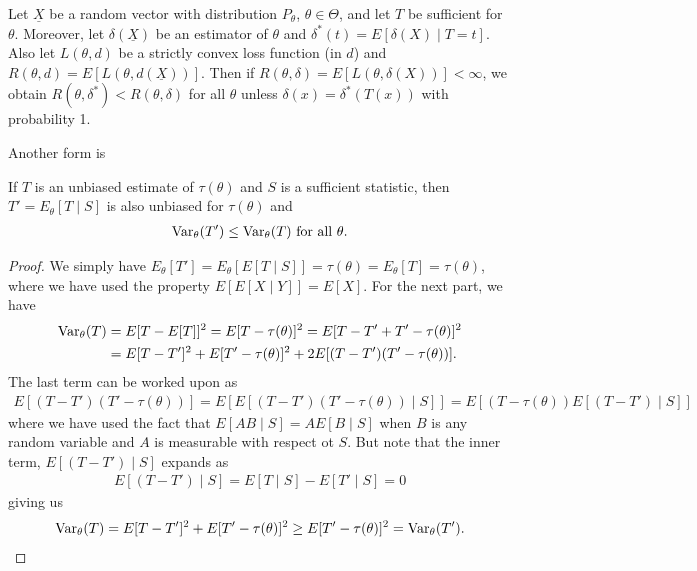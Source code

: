 \begin{theorem}
    Let $\underline{X}$ be a random vector with distribution $P_{\theta}$, $\theta \in \Theta$, and let $T$ be sufficient for $\theta$. Moreover, let $\delta(\underline{X})$ be an estimator of $\theta$ and $\delta^{\ast}(t) = E[\delta(X) \mid T = t]$. Also let $L(\theta,d)$ be a strictly convex loss function (in $d$) and $R(\theta,d) = E[L(\theta,d(\underline{X}))]$. Then if $R(\theta,\delta) = E[L(\theta,\delta(X))] < \infty$, we obtain $R(\theta,\delta^{\ast}) < R(\theta,\delta)$ for all $\theta$ unless $\delta(x) = \delta^{\ast}(T(x))$ with probability 1.
\end{theorem}

Another form is

\begin{theorem}
    If $T$ is an unbiased estimate of $\tau(\theta)$ and $S$ is a sufficient statistic, then $T' = E_{\theta}[T \mid S]$ is also unbiased for $\tau(\theta)$ and
    \begin{align}
        \operatorname{Var}_{\theta}(T') \leq \operatorname{Var}_{\theta}(T) \text{ for all } \theta.
    \end{align}
\end{theorem}

\begin{proof}
    We simply have $E_{\theta}[T'] = E_{\theta}[E[T \mid S]] = \tau(\theta) = E_{\theta}[T] = \tau(\theta)$, where we have used the property $E[E[X \mid Y]] = E[X]$. For the next part, we have
    \begin{align}
        \operatorname{Var}_{\theta}(T) &= E[T-E[T]]^{2} = E[T-\tau(\theta)]^{2} = E[T-T'+T'-\tau(\theta)]^{2} \notag \\ &= E[T-T']^{2} + E[T'-\tau(\theta)]^{2} + 2E[(T-T')(T'-\tau(\theta))].
    \end{align}
    The last term can be worked upon as
    \begin{align}
        E[(T-T')(T'-\tau(\theta))] = E[E[(T-T')(T'-\tau(\theta)) \mid S]] = E[(T-\tau(\theta))E[(T-T') \mid S]]
    \end{align}
    where we have used the fact that $E[AB \mid S] = AE[B \mid S]$ when $B$ is any random variable and $A$ is measurable with respect ot $S$. But note that the inner term, $E[(T-T') \mid S]$ expands as
    \begin{align}
        E[(T-T') \mid S] = E[T \mid S] - E[T' \mid S] = 0
    \end{align}
    giving us
    \begin{align}
        \operatorname{Var}_{\theta}(T) = E[T-T']^{2} + E[T'-\tau(\theta)]^{2} \geq E[T'-\tau(\theta)]^{2} = \operatorname{Var}_{\theta}(T').
    \end{align}
\end{proof}


